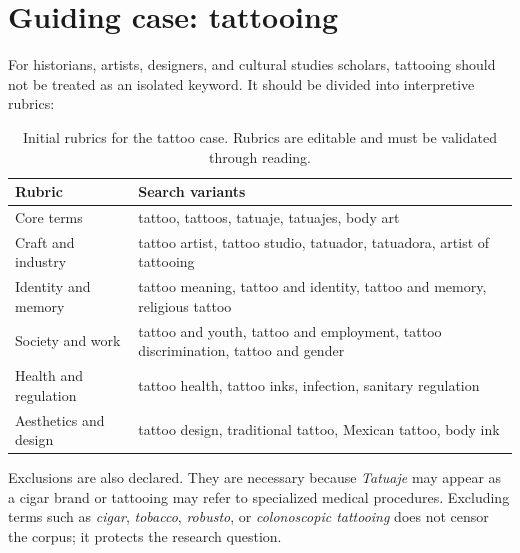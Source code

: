 \documentclass[11pt]{article}
\begin{document}
\section{Guiding case: tattooing}

For historians, artists, designers, and cultural studies scholars, tattooing
should not be treated as an isolated keyword. It should be divided into
interpretive rubrics:

\begin{table}[H]
\centering
\small
\begin{tabular}{L{0.24\textwidth}L{0.62\textwidth}}
\toprule
\textbf{Rubric} & \textbf{Search variants} \\
\midrule
Core terms & tattoo, tattoos, tatuaje, tatuajes, body art \\
Craft and industry & tattoo artist, tattoo studio, tatuador, tatuadora, artist of tattooing \\
Identity and memory & tattoo meaning, tattoo and identity, tattoo and memory, religious tattoo \\
Society and work & tattoo and youth, tattoo and employment, tattoo discrimination, tattoo and gender \\
Health and regulation & tattoo health, tattoo inks, infection, sanitary regulation \\
Aesthetics and design & tattoo design, traditional tattoo, Mexican tattoo, body ink \\
\bottomrule
\end{tabular}
\caption{Initial rubrics for the tattoo case. Rubrics are editable and must be validated through reading.}
\label{tab:tattoo-rubrics-en}
\end{table}

Exclusions are also declared. They are necessary because \textit{Tatuaje} may
appear as a cigar brand or tattooing may refer to specialized medical
procedures. Excluding terms such as \textit{cigar}, \textit{tobacco},
\textit{robusto}, or \textit{colonoscopic tattooing} does not censor the corpus;
it protects the research question.
\end{document}
